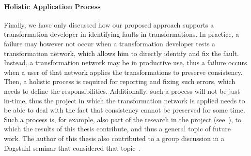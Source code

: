 \paragraph{Holistic Application Process}
Finally, we have only discussed how our proposed approach supports a transformation developer in identifying faults in transformations.
In practice, a failure may however not occur when a transformation developer tests a transformation network, which allows him to directly identify and fix the fault.
Instead, a transformation network may be in productive use, thus a failure occurs when a user of that network applies the transformations to preserve consistency.
Then, a holistic process is required for reporting and fixing such errors, which needs to define the responsibilities.
Additionally, such a process will not be just-in-time, thus the project in which the transformation network is applied needs to be able to deal with the fact that consistency cannot be preserved for some time.
Such a process is, for example, also part of the research in the \vitruv project (see~\cite{klare2020Vitruv-JSS}), to which the results of this thesis contribute, and thus a general topic of future work.
The author of this thesis also contributed to a group discussion in a Dagstuhl seminar that considered that topic~.





